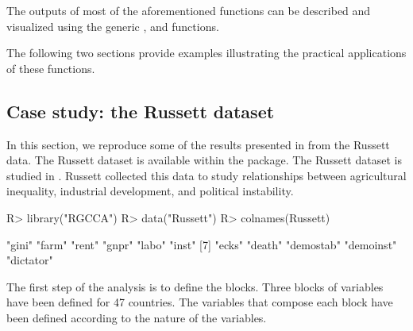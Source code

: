 \documentclass[
]{jss}
\begin{document}
The outputs of most of the aforementioned functions can be described and
visualized using the generic ,  and
 functions.

The following two sections provide examples illustrating the practical
applications of these functions.

\subsection{Case study: the Russett
dataset}\label{case-study-the-russett-dataset}

In this section, we reproduce some of the results presented in
\cite{Tenenhaus2011} from the Russett data. The Russett dataset is
available within the  package. The Russett dataset
\citep{Russett1964} is studied in \cite{Gifi1990}. Russett collected
this data to study relationships between agricultural inequality,
industrial development, and political instability.

\footnotesize

\begin{CodeChunk}
\begin{CodeInput}
R> library("RGCCA")
R> data("Russett")
R> colnames(Russett)
\end{CodeInput}
\begin{CodeOutput}
 [1] "gini"     "farm"     "rent"     "gnpr"     "labo"     "inst"    
 [7] "ecks"     "death"    "demostab" "demoinst" "dictator"
\end{CodeOutput}
\end{CodeChunk}

\normalsize

The first step of the analysis is to define the blocks. Three blocks of
variables have been defined for 47 countries. The variables that compose
each block have been defined according to the nature of the variables.
\end{document}
